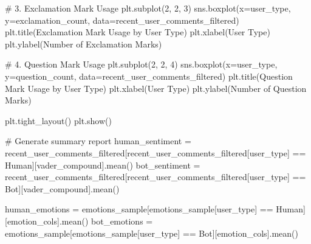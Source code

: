 \documentclass[
  12pt,
  letterpaper,
  DIV=11,
  numbers=noendperiod]{scrartcl}
\newenvironment{Shaded}{\begin{snugshade}}{\end{snugshade}}
\newcommand{\CommentTok}[1]{\textcolor[rgb]{0.37,0.37,0.37}{#1}}
\newcommand{\DecValTok}[1]{\textcolor[rgb]{0.68,0.00,0.00}{#1}}
\newcommand{\NormalTok}[1]{\textcolor[rgb]{0.00,0.23,0.31}{#1}}
\newcommand{\OperatorTok}[1]{\textcolor[rgb]{0.37,0.37,0.37}{#1}}
\newcommand{\StringTok}[1]{\textcolor[rgb]{0.13,0.47,0.30}{#1}}
\begin{document}
\begin{Shaded}
\begin{Highlighting}[]
\CommentTok{\# 3. Exclamation Mark Usage}
\NormalTok{plt.subplot(}\DecValTok{2}\NormalTok{, }\DecValTok{2}\NormalTok{, }\DecValTok{3}\NormalTok{)}
\NormalTok{sns.boxplot(x}\OperatorTok{=}\StringTok{\textquotesingle{}user\_type\textquotesingle{}}\NormalTok{, y}\OperatorTok{=}\StringTok{\textquotesingle{}exclamation\_count\textquotesingle{}}\NormalTok{, data}\OperatorTok{=}\NormalTok{recent\_user\_comments\_filtered)}
\NormalTok{plt.title(}\StringTok{\textquotesingle{}Exclamation Mark Usage by User Type\textquotesingle{}}\NormalTok{)}
\NormalTok{plt.xlabel(}\StringTok{\textquotesingle{}User Type\textquotesingle{}}\NormalTok{)}
\NormalTok{plt.ylabel(}\StringTok{\textquotesingle{}Number of Exclamation Marks\textquotesingle{}}\NormalTok{)}

\CommentTok{\# 4. Question Mark Usage}
\NormalTok{plt.subplot(}\DecValTok{2}\NormalTok{, }\DecValTok{2}\NormalTok{, }\DecValTok{4}\NormalTok{)}
\NormalTok{sns.boxplot(x}\OperatorTok{=}\StringTok{\textquotesingle{}user\_type\textquotesingle{}}\NormalTok{, y}\OperatorTok{=}\StringTok{\textquotesingle{}question\_count\textquotesingle{}}\NormalTok{, data}\OperatorTok{=}\NormalTok{recent\_user\_comments\_filtered)}
\NormalTok{plt.title(}\StringTok{\textquotesingle{}Question Mark Usage by User Type\textquotesingle{}}\NormalTok{)}
\NormalTok{plt.xlabel(}\StringTok{\textquotesingle{}User Type\textquotesingle{}}\NormalTok{)}
\NormalTok{plt.ylabel(}\StringTok{\textquotesingle{}Number of Question Marks\textquotesingle{}}\NormalTok{)}

\NormalTok{plt.tight\_layout()}
\NormalTok{plt.show()}

\CommentTok{\# Generate summary report}
\NormalTok{human\_sentiment }\OperatorTok{=}\NormalTok{ recent\_user\_comments\_filtered[recent\_user\_comments\_filtered[}\StringTok{\textquotesingle{}user\_type\textquotesingle{}}\NormalTok{] }\OperatorTok{==} \StringTok{\textquotesingle{}Human\textquotesingle{}}\NormalTok{][}\StringTok{\textquotesingle{}vader\_compound\textquotesingle{}}\NormalTok{].mean()}
\NormalTok{bot\_sentiment }\OperatorTok{=}\NormalTok{ recent\_user\_comments\_filtered[recent\_user\_comments\_filtered[}\StringTok{\textquotesingle{}user\_type\textquotesingle{}}\NormalTok{] }\OperatorTok{==} \StringTok{\textquotesingle{}Bot\textquotesingle{}}\NormalTok{][}\StringTok{\textquotesingle{}vader\_compound\textquotesingle{}}\NormalTok{].mean()}

\NormalTok{human\_emotions }\OperatorTok{=}\NormalTok{ emotions\_sample[emotions\_sample[}\StringTok{\textquotesingle{}user\_type\textquotesingle{}}\NormalTok{] }\OperatorTok{==} \StringTok{\textquotesingle{}Human\textquotesingle{}}\NormalTok{][emotion\_cols].mean()}
\NormalTok{bot\_emotions }\OperatorTok{=}\NormalTok{ emotions\_sample[emotions\_sample[}\StringTok{\textquotesingle{}user\_type\textquotesingle{}}\NormalTok{] }\OperatorTok{==} \StringTok{\textquotesingle{}Bot\textquotesingle{}}\NormalTok{][emotion\_cols].mean()}


\end{Highlighting}
\end{Shaded}
\end{document}
